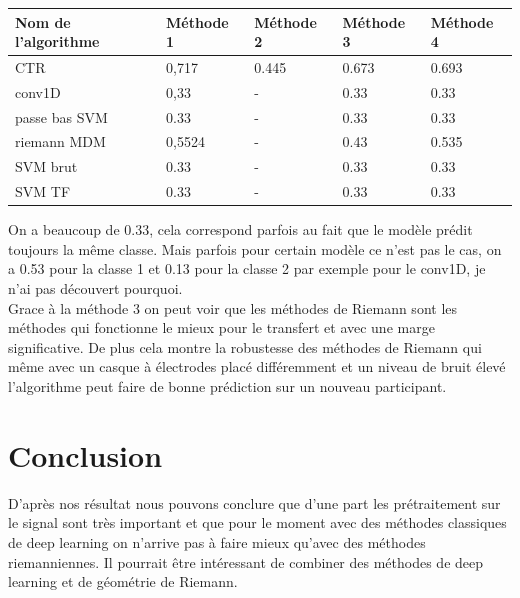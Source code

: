 \documentclass{article}[12pt]
\begin{document}
\begin{table}[H]
\begin{center}
\begin{tabular}{|l|l|l|l|l|}
\hline
Nom de l’algorithme & Méthode 1         & Méthode 2           & Méthode 3          & Méthode 4          \\
\hline
CTR                 & 0,717 & 0.445 & 0.673 & 0.693 \\
conv1D              & 0,33         & - & 0.33               & 0.33               \\
passe bas SVM       & 0.33                & - & 0.33                  & 0.33                  \\
riemann MDM         & 0,5524            & -                & 0.43               & 0.535               \\
SVM brut            & 0.33                 & - & 0.33                  & 0.33                  \\
SVM TF              & 0.33                 & - & 0.33                  & 0.33      \\
\hline           
\end{tabular}
\end{center}
\end{table}
On a beaucoup de 0.33, cela correspond parfois au fait que le modèle prédit toujours la même classe. Mais parfois pour certain modèle ce n'est pas le cas, on a  0.53 pour la classe 1 et 0.13 pour la classe 2 par exemple pour le conv1D, je n'ai pas découvert pourquoi. \\
Grace à la méthode 3 on peut voir que les méthodes de Riemann sont les méthodes qui fonctionne le mieux pour le transfert et avec une marge significative. De plus cela montre la robustesse des méthodes de Riemann qui même avec un casque à électrodes placé différemment et un niveau de bruit élevé l'algorithme peut faire de bonne prédiction sur un nouveau participant.
\part{Conclusion}
D'après nos résultat nous pouvons conclure que d'une part les prétraitement sur le signal sont très important et que pour le moment avec des méthodes classiques de deep learning on n'arrive pas à faire mieux qu'avec des méthodes riemanniennes. Il pourrait être intéressant de combiner des méthodes de deep learning et de géométrie de Riemann.

 
\end{document}
